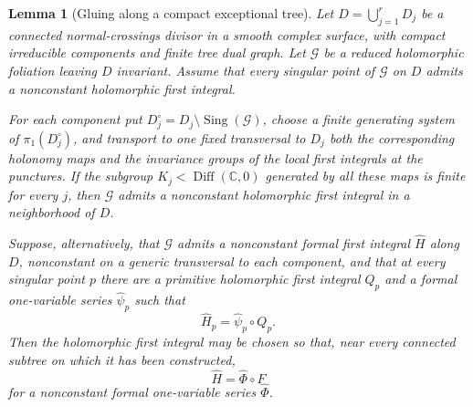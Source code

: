 \documentclass[11pt,twoside]{amsart}
\newcommand{\C}{\mathbb C}
\DeclareMathOperator{\Sing}{Sing}
\DeclareMathOperator{\Diff}{Diff}
\newtheorem{lema}{Lemma}
\theoremstyle{definition}
\begin{document}
\begin{lema}[Gluing along a compact exceptional tree]
\label{lemma:tree-gluing}\normalfont
Let $D=\bigcup_{j=1}^rD_j$ be a connected normal-crossings divisor in a
smooth complex surface, with compact irreducible components and finite tree
dual graph. Let $\mathcal G$ be a reduced holomorphic foliation leaving
$D$ invariant. Assume that every singular point of $\mathcal G$ on $D$
admits a nonconstant holomorphic first integral.

For each component put
$D_j^\circ=D_j\setminus\Sing(\mathcal G)$, choose a finite generating
system of $\pi_1(D_j^\circ)$, and transport to one fixed transversal to
$D_j$ both the corresponding holonomy maps and the invariance groups of
the local first integrals at the punctures. If the subgroup
$K_j<\Diff(\C,0)$ generated by all these maps is finite for every $j$,
then $\mathcal G$ admits a nonconstant holomorphic first integral in a
neighborhood of $D$.

Suppose, alternatively, that $\mathcal G$ admits a nonconstant formal first
integral $\widehat H$ along $D$, nonconstant on a generic transversal to
each component, and that at every singular point $p$ there are a primitive
holomorphic first integral $Q_p$ and a formal one-variable series
$\widehat\psi_p$ such that
\[
 \widehat H_p=\widehat\psi_p\circ Q_p.
\]
Then the holomorphic first integral may be chosen so that, near every
connected subtree on which it has been constructed,
\[
 \widehat H=\widehat\Phi\circ F
\]
for a nonconstant formal one-variable series $\widehat\Phi$.
\end{lema}
\end{document}
